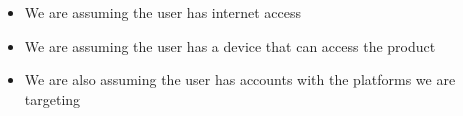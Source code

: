 \begin{itemize}
  \item We are assuming the user has internet access
  \item We are assuming the user has a device that can access the product
  \item We are also assuming the user has accounts with the platforms we are targeting
\end{itemize}